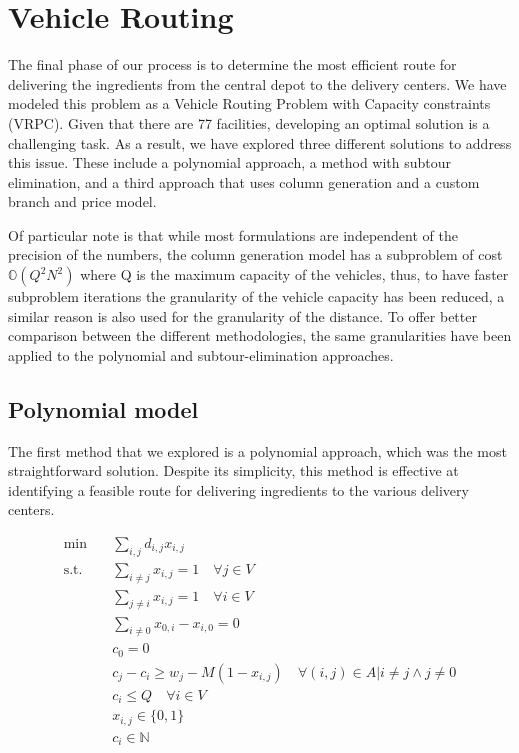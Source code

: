 \chapter{Vehicle Routing}
\label{vehicle-routing}
The final phase of our process is to determine the most efficient route for delivering the ingredients from the central depot to the delivery centers. We have modeled this problem as a Vehicle Routing Problem with Capacity constraints (VRPC). Given that there are 77 facilities, developing an optimal solution is a challenging task. As a result, we have explored three different solutions to address this issue. These include a polynomial approach, a method with subtour elimination, and a third approach that uses column generation and a custom branch and price model.

Of particular note is that while most formulations are independent of the precision of the numbers, the column generation model has a subproblem of cost $\mathbb{O}(Q^2N^2)$ where Q is the maximum capacity of the vehicles, thus, to have faster subproblem iterations the granularity of the vehicle capacity has been reduced, a similar reason is also used for the granularity of the distance. To offer better comparison between the different methodologies, the same granularities have been applied to the polynomial and subtour-elimination approaches.

\section{Polynomial model}
\label{polynomial-model}
The first method that we explored is a polynomial approach, which was the most straightforward solution. Despite its simplicity, this method is effective at identifying a feasible route for delivering ingredients to the various delivery centers.

\begin{align*}
    \min \quad & \sum_{i,j}{d_{i,j}x_{i,j}}\\
    \textrm{s.t.} \quad
      &\sum_{i \ne j} {x_{i,j}} = 1 \quad \forall j \in V \tag{1}\\
      &\sum_{j \ne i} {x_{i,j}} = 1 \quad \forall i \in V \tag{2}\\
      &\sum_{i \ne 0} {x_{0,i} - x_{i, 0}} = 0 \tag{3}\\
      &c_0 = 0 \tag{4}\\
      &c_j - c_i \geq w_j - M(1 - x_{i,j}) \quad \forall (i,j) \in A | i \ne j \land j \ne 0 \tag{5}\\
      &c_i \leq Q \quad \forall i \in V \tag{6}\\
      &x_{i,j} \in \{0,1\} \\
      &c_{i} \in \mathbb{N} \\
\end{align*}

